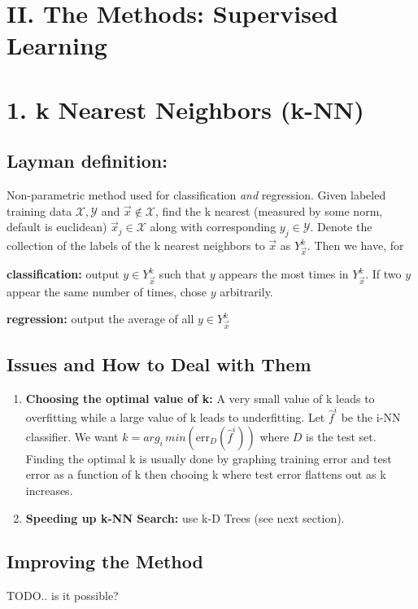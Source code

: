 \documentclass[10pt]{article}
\begin{document}
			
\section*{II. The Methods: Supervised Learning}

\section*{1. k Nearest Neighbors (k-NN)}
	\subsection*{Layman definition:} 
	Non-parametric method used for classification \textit{and} regression. Given labeled training data
	$\mathcal{X}, \mathcal{Y} $ and $\vec{x} \not \in \mathcal{X}$, find the k nearest (measured by some norm, 
	default is euclidean) $ \vec{x}_j \in \mathcal{X} $ along with corresponding $y_j \in \mathcal{Y}$. Denote the 
	collection of the labels of the k nearest neighbors to $\vec x$ as $Y_{\vec x}^k $. Then we have, for 
	
	\indent \textbf{classification:} output $y \in Y_{\vec x}^k $ such that $y$ appears the most times in $Y_{\vec x}^k $. 
	\indent If two $y$ appear the same number of times, chose $y$ arbitrarily. 
	
	\indent \textbf{regression:} output the average of all $y \in  Y_{\vec x}^k  $ 
	
	\subsection*{Issues and How to Deal with Them}
		\begin{enumerate}
			\item \textbf{Choosing the optimal value of k: } A very small value of k leads to overfitting while a large
			value of k leads to underfitting. Let $\hat f^i$ be the i-NN classifier. We want 
			$k = arg_i \,min( \textrm{err}_D(\hat f^i) )$ where $D$ is the test set. Finding the optimal k
			is usually done by graphing training error and test error as a function of k then chooing k where test error
			flattens out as k increases. 
			\item \textbf{Speeding up k-NN Search:} use k-D Trees (see next section).
		\end{enumerate}
		
	
	\subsection*{Improving the Method}
		TODO.. is it possible?
\end{document}
